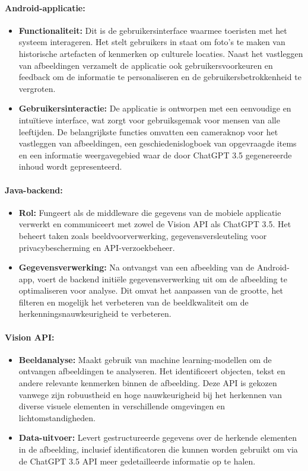 \paragraph{Android-applicatie:}
\begin{itemize}
    \item \textbf{Functionaliteit:} Dit is de gebruikersinterface waarmee toeristen met het systeem interageren. Het stelt gebruikers in staat om foto's te maken van historische artefacten of kenmerken op culturele locaties. Naast het vastleggen van afbeeldingen verzamelt de applicatie ook gebruikersvoorkeuren en feedback om de informatie te personaliseren en de gebruikersbetrokkenheid te vergroten.
    \item \textbf{Gebruikersinteractie:} De applicatie is ontworpen met een eenvoudige en intuïtieve interface, wat zorgt voor gebruiksgemak voor mensen van alle leeftijden. De belangrijkste functies omvatten een cameraknop voor het vastleggen van afbeeldingen, een geschiedenislogboek van opgevraagde items en een informatie weergavegebied waar de door ChatGPT 3.5 gegenereerde inhoud wordt gepresenteerd.
\end{itemize}

\paragraph{Java-backend:}
\begin{itemize}
    \item \textbf{Rol:} Fungeert als de middleware die gegevens van de mobiele applicatie verwerkt en communiceert met zowel de Vision API als ChatGPT 3.5. Het beheert taken zoals beeldvoorverwerking, gegevensversleuteling voor privacybescherming en API-verzoekbeheer.
    \item \textbf{Gegevensverwerking:} Na ontvangst van een afbeelding van de Android-app, voert de backend initiële gegevensverwerking uit om de afbeelding te optimaliseren voor analyse. Dit omvat het aanpassen van de grootte, het filteren en mogelijk het verbeteren van de beeldkwaliteit om de herkenningsnauwkeurigheid te verbeteren.
\end{itemize}

\paragraph{Vision API:}
\begin{itemize}
    \item \textbf{Beeldanalyse:} Maakt gebruik van machine learning-modellen om de ontvangen afbeeldingen te analyseren. Het identificeert objecten, tekst en andere relevante kenmerken binnen de afbeelding. Deze API is gekozen vanwege zijn robuustheid en hoge nauwkeurigheid bij het herkennen van diverse visuele elementen in verschillende omgevingen en lichtomstandigheden.
    \item \textbf{Data-uitvoer:} Levert gestructureerde gegevens over de herkende elementen in de afbeelding, inclusief identificatoren die kunnen worden gebruikt om via de ChatGPT 3.5 API meer gedetailleerde informatie op te halen.
\end{itemize}

